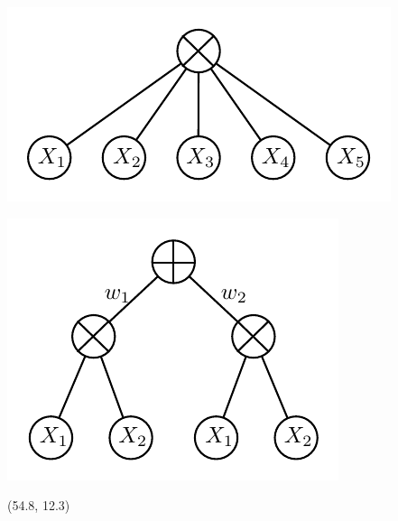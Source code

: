 \documentclass[final]{beamer}
\begin{document}
\begin{frame}{}
\begin{textblock}{25.2}
    
    \begin{minipage}{0.5\linewidth}
      \centering
      \includegraphics[width=0.65\linewidth]{figures/spn-prod}
    \end{minipage}\begin{minipage}{0.5\linewidth}
      \centering
      \includegraphics[width=0.55\linewidth]{figures/spn-sum}
    \end{minipage}
    
    
  \end{textblock}

  
  \begin{textblock}{25.2}(54.8, 12.3)
    \footnotesize
    \begin{minipage}{0.7\linewidth}
    

\end{minipage}
\end{textblock}
\end{frame}
\end{document}
